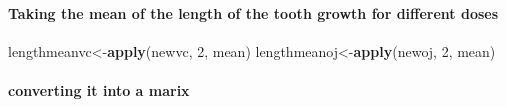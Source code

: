 \documentclass[]{article}
\newenvironment{Shaded}{\begin{snugshade}}{\end{snugshade}}
\newcommand{\KeywordTok}[1]{\textcolor[rgb]{0.13,0.29,0.53}{\textbf{#1}}}
\newcommand{\DecValTok}[1]{\textcolor[rgb]{0.00,0.00,0.81}{#1}}
\newcommand{\FloatTok}[1]{\textcolor[rgb]{0.00,0.00,0.81}{#1}}
\newcommand{\OperatorTok}[1]{\textcolor[rgb]{0.81,0.36,0.00}{\textbf{#1}}}
\newcommand{\NormalTok}[1]{#1}
\let\oldparagraph\paragraph
\renewcommand{\paragraph}[1]{\oldparagraph{#1}\mbox{}}
\begin{document}
\begin{Shaded}
\end{Shaded}

\paragraph{Taking the mean of the length of the tooth growth for
different
doses}\label{taking-the-mean-of-the-length-of-the-tooth-growth-for-different-doses}

\begin{Shaded}
\begin{Highlighting}[]
\NormalTok{lengthmeanvc<-}\KeywordTok{apply}\NormalTok{(newvc, }\DecValTok{2}\NormalTok{, mean)}
\NormalTok{lengthmeanoj<-}\KeywordTok{apply}\NormalTok{(newoj, }\DecValTok{2}\NormalTok{, mean)}
\end{Highlighting}
\end{Shaded}

\paragraph{converting it into a marix}\label{converting-it-into-a-marix}
\end{document}

